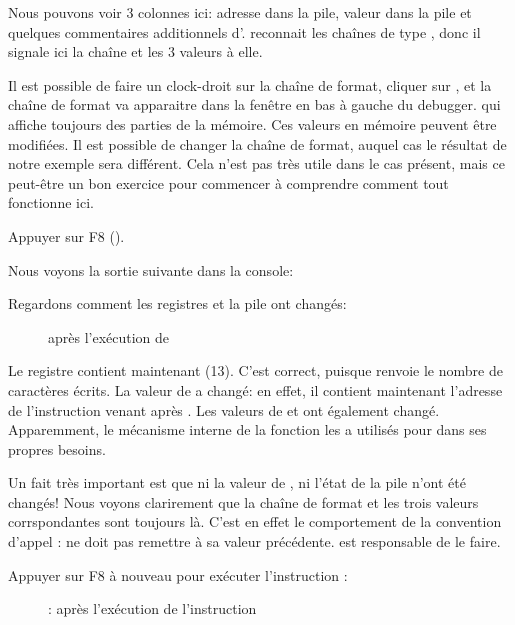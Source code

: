 Nous pouvons voir 3 colonnes ici: adresse dans la pile, valeur dans la pile et quelques
commentaires additionnels d'\olly.
\olly reconnait les chaînes de type \printf{}, donc il signale ici la chaîne et
les 3 valeurs  à elle.

Il est possible de faire un clock-droit sur la chaîne de format, cliquer sur ,
et la chaîne de format va apparaitre dans la fenêtre en bas à gauche du debugger. qui affiche
toujours des parties de la mémoire.
Ces valeurs en mémoire peuvent être modifiées.
Il est possible de changer la chaîne de format, auquel cas le résultat de notre
exemple sera différent.
Cela n'est pas très utile dans le cas présent, mais ce peut-être un bon exercice
pour commencer à comprendre comment tout fonctionne ici.

\clearpage
Appuyer sur F8 (\stepover).

Nous voyons la sortie suivante dans la console:



Regardons comment les registres et la pile ont changés:

\begin{figure}[H]
\centering
{}
\caption{\olly après l'exécution de \printf{}}
\label{fig:printf3_olly_3}
\end{figure}

Le registre \EAX contient maintenant  (13).
C'est correct, puisque \printf renvoie le nombre de caractères écrits.
La valeur de \EIP a changé: en effet, il contient maintenant l'adresse de l'instruction
venant après
.
Les valeurs de \ECX et \EDX ont également changé.
Apparemment, le mécanisme interne de la fonction \printf les a utilisés pour dans
ses propres besoins.

Un fait très important est que ni la valeur de \ESP, ni l'état de la pile n'ont
été changés!
Nous voyons clarirement que la chaîne de format et les trois valeurs corrspondantes
sont toujours là.
C'est en effet le comportement de la convention d'appel : 
ne doit pas remettre \ESP à sa valeur précédente.
 est responsable de le faire.

\clearpage
Appuyer sur F8 à nouveau pour exécuter l'instruction :

\begin{figure}[H]
\centering
{}
\caption{\olly: après l'exécution de l'instruction }
\label{fig:printf3_olly_4}
\end{figure}

